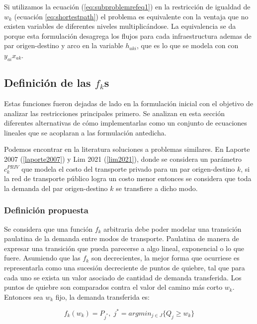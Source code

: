 \documentclass{article}
\begin{document}
  Si utilizamos la ecuación (\ref{eq:subproblemrefeq1}) en la restricción de igualdad de $w_k$ (ecuación \ref{eq:shortestpath}) el problema es equivalente con la ventaja que no existen variables de diferentes niveles multiplicándose. La equivalencia se da porque esta formulación desagrega los flujos para cada infraestructura ademas de par origen-destino y arco en la variable $h_{aki}$, que es lo que se modela con con $y_{ai} x_{ak}$.

  \subsection*{Definición de las $f_k$s}

  Estas funciones fueron dejadas de lado en la formulación inicial con el objetivo de analizar las restricciones principales primero. Se analizan en esta sección diferentes alternativas de cómo implementarlas como un conjunto de ecuaciones lineales que se acoplaran a las formulación antedicha.

  Podemos encontrar en la literatura soluciones a problemas similares. En Laporte 2007 (\ref{laporte2007}) y Lim 2021 (\ref{lim2021}), donde se considera un parámetro $c^{PRIV}_k$ que modela el costo del transporte privado para un par origen-destino $k$, si la red de transporte público logra un costo menor entonces se considera que toda la demanda del par origen-destino $k$ se transfiere a dicho modo.

  \subsubsection*{Definición propuesta}

  Se considera que una función $f_k$ arbitraria debe poder modelar una transición paulatina de la demanda entre modos de transporte. Paulatina de manera de expresar una transición que pueda parecerse a algo lineal, exponencial o lo que fuere. Asumiendo que las $f_k$ son decrecientes, la mejor forma que ocurriese es representarla como una sucesión decreciente de puntos de quiebre, tal que para cada uno se exista un valor asociado de cantidad de demanda transferida. Los puntos de quiebre son comparados contra el valor del camino más corto $w_k$. Entonces sea $w_k$ fijo, la demanda transferida es:

  \begin{equation}
    \label{eq:deffks}
    f_k(w_k) = P_{j^*},\; j^* = argmin_{j \in J} \{Q_j \geq w_k\}
  \end{equation}
  
\end{document}
